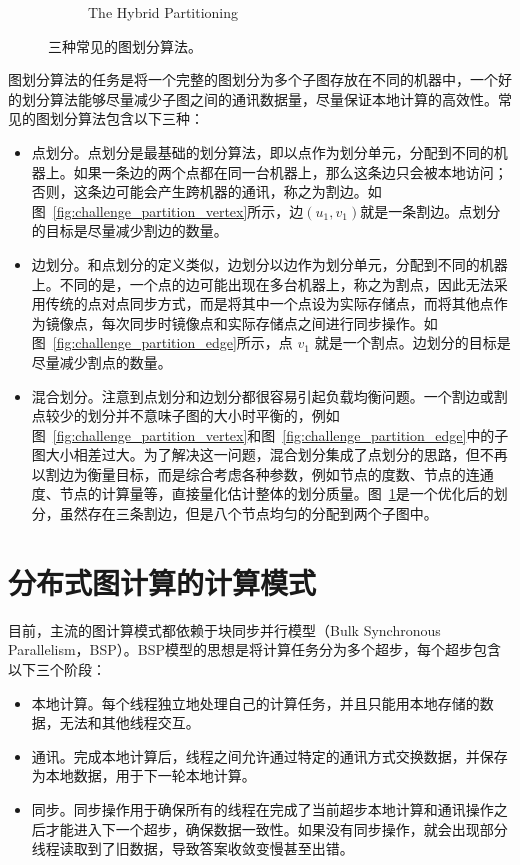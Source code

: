 \begin{figure}[h]
\begin{subfigure}{0.3\linewidth}
            \caption{The Hybrid Partitioning}
            \label{fig:challenge_partition_hybrid}
        \end{subfigure}
     \caption{三种常见的图划分算法。}
    \label{fig:challenge_partition}
\end{figure}

图划分算法的任务是将一个完整的图划分为多个子图存放在不同的机器中，一个好的划分算法能够尽量减少子图之间的通讯数据量，尽量保证本地计算的高效性。常见的图划分算法包含以下三种：
\begin{itemize}
    \item 点划分。点划分是最基础的划分算法，即以点作为划分单元，分配到不同的机器上。如果一条边的两个点都在同一台机器上，那么这条边只会被本地访问；否则，这条边可能会产生跨机器的通讯，称之为割边。如图~\ref{fig:challenge_partition_vertex}所示，边$(u_1, v_1)$就是一条割边。点划分的目标是尽量减少割边的数量。

    \item 边划分。和点划分的定义类似，边划分以边作为划分单元，分配到不同的机器上。不同的是，一个点的边可能出现在多台机器上，称之为割点，因此无法采用传统的点对点同步方式，而是将其中一个点设为实际存储点，而将其他点作为镜像点，每次同步时镜像点和实际存储点之间进行同步操作。如图~\ref{fig:challenge_partition_edge}所示，点 $v_1$ 就是一个割点。边划分的目标是尽量减少割点的数量。
    
    \item 混合划分。注意到点划分和边划分都很容易引起负载均衡问题。一个割边或割点较少的划分并不意味子图的大小时平衡的，例如图~\ref{fig:challenge_partition_vertex}和图~\ref{fig:challenge_partition_edge}中的子图大小相差过大。为了解决这一问题，混合划分集成了点划分的思路，但不再以割边为衡量目标，而是综合考虑各种参数，例如节点的度数、节点的连通度、节点的计算量等，直接量化估计整体的划分质量。图~\ref{fig:challenge_partition_hybrid}是一个优化后的划分，虽然存在三条割边，但是八个节点均匀的分配到两个子图中。
\end{itemize}



\section{分布式图计算的计算模式}

目前，主流的图计算模式都依赖于块同步并行模型（Bulk Synchronous Parallelism，BSP）。BSP模型的思想是将计算任务分为多个超步，每个超步包含以下三个阶段：

\begin{itemize}
    \item 本地计算。每个线程独立地处理自己的计算任务，并且只能用本地存储的数据，无法和其他线程交互。
    \item 通讯。完成本地计算后，线程之间允许通过特定的通讯方式交换数据，并保存为本地数据，用于下一轮本地计算。
    \item 同步。同步操作用于确保所有的线程在完成了当前超步本地计算和通讯操作之后才能进入下一个超步，确保数据一致性。如果没有同步操作，就会出现部分线程读取到了旧数据，导致答案收敛变慢甚至出错。
\end{itemize}

